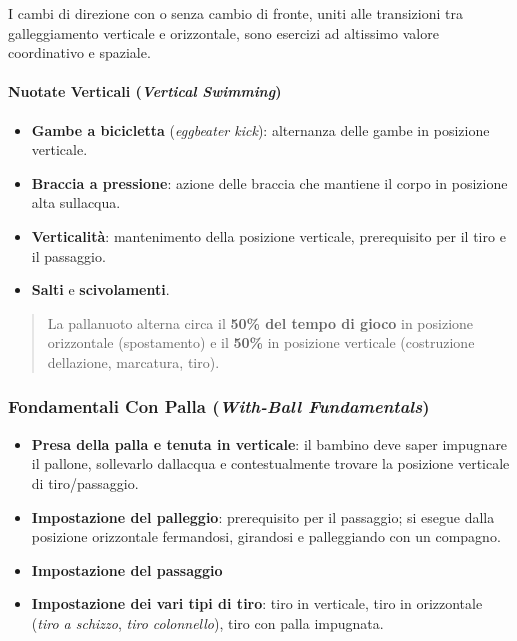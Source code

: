 \documentclass[a4paper,11pt]{article}
\providecommand{\tightlist}{%
  \setlength{\itemsep}{0pt}\setlength{\parskip}{0pt}}
\begin{document}
I cambi di direzione con o senza cambio di fronte, uniti alle
transizioni tra galleggiamento verticale e orizzontale, sono esercizi ad
altissimo valore coordinativo e spaziale.

\paragraph{\texorpdfstring{Nuotate Verticali (\emph{Vertical
                  Swimming})}{Nuotate Verticali (Vertical Swimming)}}\label{nuotate-verticali-vertical-swimming}

\begin{itemize}
      \tightlist
      \item
            \textbf{Gambe a bicicletta} (\emph{eggbeater kick}): alternanza delle
            gambe in posizione verticale.
      \item
            \textbf{Braccia a pressione}: azione delle braccia che mantiene il
            corpo in posizione alta sull\textquotesingle acqua.
      \item
            \textbf{Verticalità}: mantenimento della posizione verticale,
            prerequisito per il tiro e il passaggio.
      \item
            \textbf{Salti} e \textbf{scivolamenti}.
\end{itemize}

\begin{quote}
      La pallanuoto alterna circa il \textbf{50\% del tempo di gioco} in
      posizione orizzontale (spostamento) e il \textbf{50\%} in posizione
      verticale (costruzione dell\textquotesingle azione, marcatura, tiro).
\end{quote}

\subsubsection{\texorpdfstring{Fondamentali Con Palla (\emph{With-Ball
                  Fundamentals})}{Fondamentali Con Palla (With-Ball Fundamentals)}}\label{fondamentali-con-palla-with-ball-fundamentals}

\begin{itemize}
      \tightlist
      \item
            \textbf{Presa della palla e tenuta in verticale}: il bambino deve
            saper impugnare il pallone, sollevarlo dall\textquotesingle acqua e
            contestualmente trovare la posizione verticale di tiro/passaggio.
      \item
            \textbf{Impostazione del palleggio}: prerequisito per il passaggio; si
            esegue dalla posizione orizzontale fermandosi, girandosi e
            palleggiando con un compagno.
      \item
            \textbf{Impostazione del passaggio}
      \item
            \textbf{Impostazione dei vari tipi di tiro}: tiro in verticale, tiro
            in orizzontale (\emph{tiro a schizzo}, \emph{tiro colonnello}), tiro
            con palla impugnata.
\end{itemize}
\end{document}
